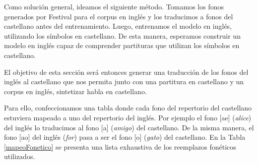 Como solución general, ideamos el siguiente método. Tomamos los fonos generados por Festival para el corpus en inglés y los traducimos a fonos del castellano antes del entrenamiento. Luego, entrenamos el modelo en inglés, utilizando los símbolos en castellano. De esta manera, esperamos construir un modelo en inglés capaz de comprender partituras que utilizan los símbolos en castellano.

El objetivo de esta sección será entonces generar una traducción de los fonos del inglés al castellano que nos permita junto con una partitura en castellano y un corpus en inglés, sintetizar habla en castellano.

Para ello, confeccionamos una tabla donde cada fono del repertorio del castellano estuviera mapeado a uno del repertorio del inglés. Por ejemplo el fono [ae] (\textit{alice}) del inglés lo traducimos al fono [a] (\textit{amigo}) del castellano. De la misma manera, el fono [ao] del inglés (\textit{for}) pasa a ser el fono [o] (\textit{gato}) del castellano. En la Tabla \ref{mapeoFonetico} se presenta una lista exhaustiva de los reemplazos fonéticos utilizados.

